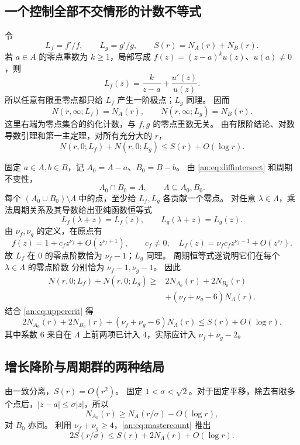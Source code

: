 \documentclass[11pt,a4paper,oneside,openany]{book}
\theoremstyle{lecture}
\numberwithin{equation}{section}
\begin{document}
\subsection{一个控制全部不交情形的计数不等式}
令
\[
 L_f=f'/f,\qquad L_g=g'/g,\qquad S(r)=N_A(r)+N_B(r).
\]
若 $a\in A$ 的零点重数为 $k\ge1$，局部写成
$f(z)=(z-a)^k u(z)$、$u(a)\ne0$，则
\[
 L_f(z)=\frac{k}{z-a}+\frac{u'(z)}{u(z)}.
\]
所以任意有限重零点都只给 $L_f$ 产生一阶极点；$L_g$ 同理。
因而
\[
 N(r,\infty;L_f)=N_A(r),\qquad N(r,\infty;L_g)=N_B(r).
\]
这里右端为零点集合的约化计数，与 $f,g$ 的零点重数无关。
由有限阶结论、对数导数引理和第一主定理，对所有充分大的 $r$，
\begin{equation}\label{an:eq:uppercrit}
 N(r,0;L_f)+N(r,0;L_g)\le S(r)+O(\log r).
\end{equation}

固定 $a\in A,b\in B$，记 $A_0=A-a$、$B_0=B-b$。
由 \eqref{an:eq:diffintersect} 和周期不变性，
\begin{equation}\label{an:eq:cosetintersect}
 A_0\cap B_0=\Lambda,\qquad \Lambda\subseteq A_0,B_0.
\end{equation}
每个 $(A_0\cup B_0)\setminus\Lambda$ 中的点，至少给 $L_f,L_g$ 各贡献一个零点。
对任意 $\lambda\in\Lambda$，乘法周期关系及其导数给出亚纯函数恒等式
\[
 L_f(\lambda+z)=L_f(z),\qquad L_g(\lambda+z)=L_g(z).
\]
由 $\nu_f,\nu_g$ 的定义，在原点有
\[
 f(z)=1+c_f z^{\nu_f}+O(z^{\nu_f+1}),\qquad c_f\ne0,
 \quad L_f(z)=\nu_f c_f z^{\nu_f-1}+O(z^{\nu_f}).
\]
故 $L_f$ 在 $0$ 的零点阶数恰为 $\nu_f-1$；$L_g$ 同理。
周期恒等式遂说明它们在每个 $\lambda\in\Lambda$ 的零点阶数
分别恰为 $\nu_f-1,\nu_g-1$。
因此
\begin{align*}
 N(r,0;L_f)+N(r,0;L_g)
 \ge{}&2N_{A_0}(r)+2N_{B_0}(r)\\
 &+(\nu_f+\nu_g-6)N_\Lambda(r).
\end{align*}
结合 \eqref{an:eq:uppercrit} 得
\begin{equation}\label{an:eq:mastercount}
 \boxed{\;
 2N_{A_0}(r)+2N_{B_0}(r)
 +(\nu_f+\nu_g-6)N_\Lambda(r)
 \le S(r)+O(\log r).\;}
\end{equation}
其中系数 $6$ 来自在 $\Lambda$ 上前两项已计入 $4$，实际应计入 $\nu_f+\nu_g-2$。

\subsection{增长降阶与周期群的两种结局}
由一致分离，$S(r)=O(r^2)$。
固定 $1<\sigma<\sqrt2$。对于固定平移，除去有限多个点后，$|z-a|\le\sigma|z|$，所以
\[
 N_{A_0}(r)\ge N_A(r/\sigma)-O(\log r),
\]
对 $B_0$ 亦同。
利用 $\nu_f+\nu_g\ge4$，\eqref{an:eq:mastercount} 推出
\begin{equation}\label{an:eq:recurrence}
 2S(r/\sigma)\le S(r)+2N_\Lambda(r)+O(\log r).
\end{equation}
\end{document}
